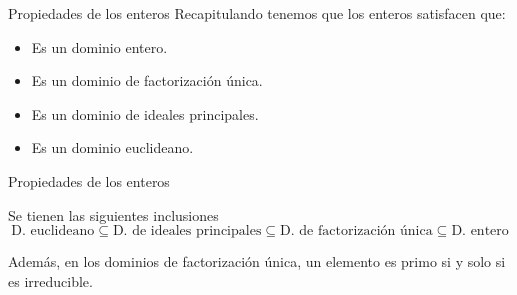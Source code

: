\begin{frame}{Propiedades de los enteros}
  Recapitulando tenemos que los enteros satisfacen que:
  \begin{itemize}[<+->]
    \item Es un dominio entero. \medskip
    \item Es un dominio de factorización única. \medskip
    \item Es un dominio de ideales principales. \medskip
    \item Es un dominio euclideano. \medskip
  \end{itemize}
\end{frame}

\begin{frame}{Propiedades de los enteros}
  \begin{theorem}
    Se tienen las siguientes inclusiones
    \[
      \text{D. euclideano} \subseteq \text{D. de ideales principales} \subseteq \text{D. de factorización única} \subseteq \text{D. entero}
    \]

    Además, en los dominios de factorización única, un elemento es primo si y solo si es irreducible.
  \end{theorem}
\end{frame}
